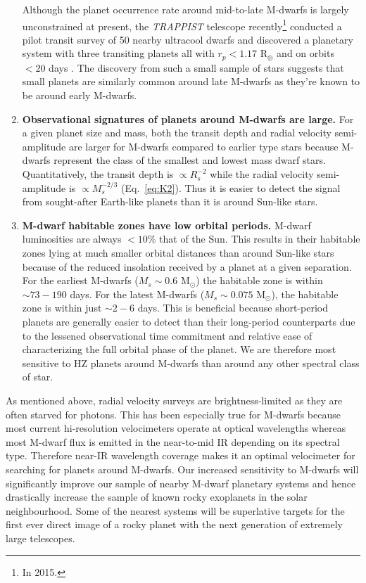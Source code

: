 \begin{enumerate}
Although the planet occurrence rate around mid-to-late M-dwarfs is largely unconstrained 
at present, the \emph{TRAPPIST} telescope \parencite{gillon11} recently\footnote{In 2015.} 
conducted a pilot transit survey of 50 nearby ultracool dwarfs and discovered a planetary 
system with three transiting planets all with $r_p < 1.17$ R$_{\oplus}$ and on orbits $< 20$ 
days \parencite{gillon16}. The discovery from such a small sample of stars suggests that 
small planets are similarly common around late M-dwarfs as they're known to be around 
early M-dwarfs. 
\item \textbf{Observational signatures of planets around M-dwarfs are large.} 
For a given planet size and mass, both the 
transit depth and radial velocity semi-amplitude are larger for M-dwarfs 
compared to earlier type stars because M-dwarfs represent the class of the 
smallest and lowest mass dwarf stars. Quantitatively, the transit depth is 
$\propto R_s^{-2}$ while the radial velocity semi-amplitude is 
$\propto M_s^{-2/3}$ (Eq.~\ref{eq:K2}). Thus it is easier to detect the signal 
from sought-after Earth-like planets than it is around Sun-like stars. 
\item \textbf{M-dwarf habitable zones have low orbital periods.} 
M-dwarf luminosities are always $< 10$\% that of the Sun. This results in 
their habitable zones lying at much smaller orbital distances than around Sun-like 
stars because of the reduced insolation received by a planet at a given separation. 
For the earliest M-dwarfs 
($M_s\sim 0.6$ M$_{\odot}$) the habitable zone is within 
$\sim 73-190$ days. For the 
latest M-dwarfs ($M_s\sim 0.075$ M$_{\odot}$), the habitable zone is within just 
$\sim 2-6$ days. This is beneficial because short-period planets are generally 
easier to detect than their 
long-period counterparts due to the lessened observational time commitment and 
relative ease of characterizing the full orbital phase of the planet. 
We are therefore most sensitive to HZ planets around M-dwarfs than around any 
other spectral class of star.
\end{enumerate}

As mentioned above, radial velocity surveys are brightness-limited as they are 
often starved for photons. This has been especially true for M-dwarfs because 
most current hi-resolution velocimeters operate at 
optical wavelengths whereas most M-dwarf flux is emitted in the near-to-mid IR 
depending on its spectral type. Therefore 
 near-IR wavelength coverage makes it an optimal velocimeter for 
searching for planets around M-dwarfs. Our increased sensitivity to 
M-dwarfs will significantly improve our sample of 
nearby M-dwarf planetary systems and hence drastically increase the sample of known 
rocky exoplanets in the solar neighbourhood. Some of the nearest systems will 
be superlative targets for the first ever direct image of a rocky planet with the 
next generation of extremely large telescopes. 

